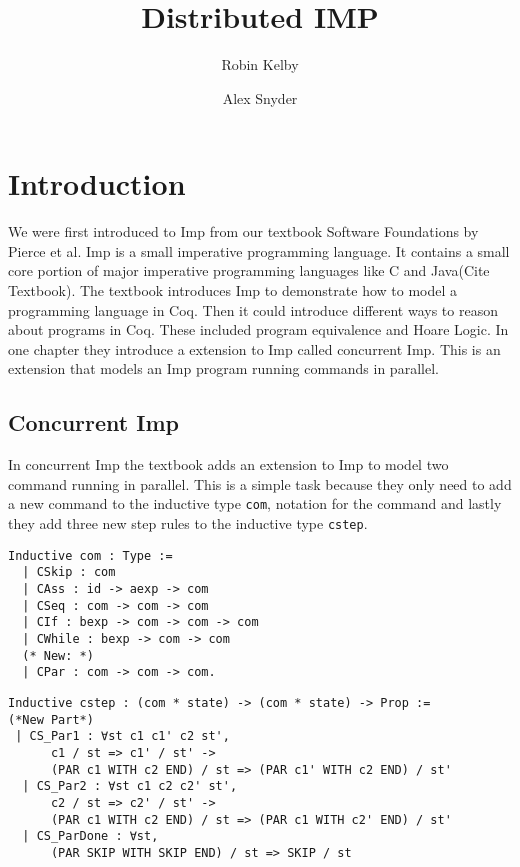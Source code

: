 \documentclass{llncs}
\begin{document}
\title{Distributed IMP}

\author{Robin Kelby \and Alex Snyder}

\maketitle

\section{Introduction}
We were first introduced to Imp from our textbook Software Foundations by Pierce et al. Imp is a small imperative programming language. It contains a small core portion of major imperative programming languages like C and Java(Cite Textbook). The textbook introduces Imp to demonstrate how to model a programming language in Coq. Then it could introduce different ways to reason about programs in Coq. These included program equivalence and Hoare Logic. In one chapter they introduce a extension to Imp called concurrent Imp. This is an extension that models an Imp program running commands in parallel.

\subsection{Concurrent Imp} 
In concurrent Imp the textbook adds an extension to Imp to model two command running in parallel. This is a simple task because they only need to add a new command to the inductive type \lstinline|com|, notation for the command and lastly they add three new step rules to the inductive type \lstinline|cstep|.  

\begin{lstlisting}
Inductive com : Type :=
  | CSkip : com
  | CAss : id -> aexp -> com
  | CSeq : com -> com -> com
  | CIf : bexp -> com -> com -> com
  | CWhile : bexp -> com -> com
  (* New: *)
  | CPar : com -> com -> com.
\end{lstlisting}

\begin{lstlisting}
Inductive cstep : (com * state) -> (com * state) -> Prop :=
(*New Part*)
 | CS_Par1 : ∀st c1 c1' c2 st',
      c1 / st => c1' / st' ->
      (PAR c1 WITH c2 END) / st => (PAR c1' WITH c2 END) / st'
  | CS_Par2 : ∀st c1 c2 c2' st',
      c2 / st => c2' / st' ->
      (PAR c1 WITH c2 END) / st => (PAR c1 WITH c2' END) / st'
  | CS_ParDone : ∀st,
      (PAR SKIP WITH SKIP END) / st => SKIP / st
\end{lstlisting}
\end{document}
